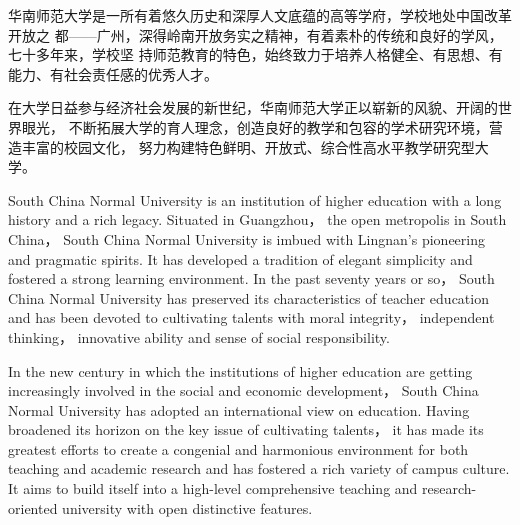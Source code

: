 ﻿\begin{cabstract}
华南师范大学是一所有着悠久历史和深厚人文底蕴的高等学府，学校地处中国改革开放之%
都——广州，深得岭南开放务实之精神，有着素朴的传统和良好的学风，七十多年来，学校坚%
持师范教育的特色，始终致力于培养人格健全、有思想、有能力、有社会责任感的优秀人才。%

在大学日益参与经济社会发展的新世纪，华南师范大学正以崭新的风貌、开阔的世界眼光，%
不断拓展大学的育人理念，创造良好的教学和包容的学术研究环境，营造丰富的校园文化，%
努力构建特色鲜明、开放式、综合性高水平教学研究型大学。%
\end{cabstract}

\begin{eabstract}
  South China Normal University is an institution of higher education with a
  long history and a rich legacy. Situated in Guangzhou， the open metropolis in
  South China， South China Normal University is imbued with Lingnan's
  pioneering and pragmatic spirits. It has developed a tradition of elegant
  simplicity and fostered a strong learning environment. In the past seventy
  years or so， South China Normal University has preserved its characteristics
  of teacher education and has been devoted to cultivating talents with moral
  integrity， independent thinking， innovative ability and sense of social
  responsibility.

  In the new century in which the institutions of higher education are getting
  increasingly involved in the social and economic development， South China
  Normal University has adopted an international view on education. Having
  broadened its horizon on the key issue of cultivating talents， it has made its
  greatest efforts to create a congenial and harmonious environment for both
  teaching and academic research and has fostered a rich variety of campus
  culture. It aims to build itself into a high-level comprehensive teaching and
  research-oriented university with open distinctive features.
\end{eabstract}

